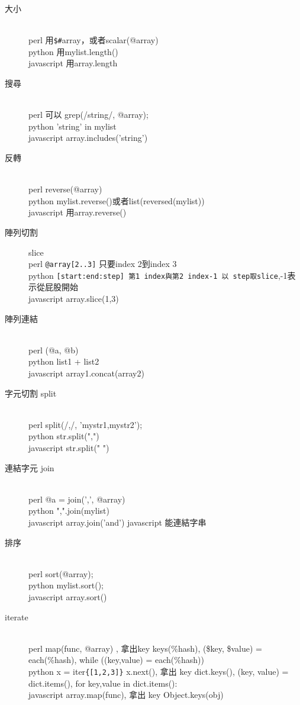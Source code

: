 \begin{description}
  \item [大小] \hfill \\
    perl 用\verb=$#=array，或者scalar(@array)\\
    python 用mylist.length()\\
    javascript 用array.length
  \item [搜尋] \hfill \\
    perl 可以 grep(/string/, @array);\\
    python 'string' in mylist\\
    javascript array.includes('string')
  \item [反轉] \hfill \\
    perl reverse(@array) \\
    python mylist.reverse()或者list(reversed(mylist))\\
    javascript 用array.reverse()
  \item [陣列切割] slice \hfill \\
    perl \verb=@array[2..3]= 只要index 2到index 3\\
    python \verb=[start:end:step] 第1 index與第2 index-1 以 step取slice=,-1表示從屁股開始\\
    javascript array.slice(1,3)
  \item [陣列連結] \hfill \\
    perl (@a, @b) \\
    python list1 + list2\\
    javascript array1.concat(array2)
  \item [字元切割 split] \hfill \\
    perl split(/,/, 'mystr1,mystr2');\\
    python str.split(",")\\
    javascript str.split(" ")
  \item [連結字元 join] \hfill \\
    perl @a = join(',', @array)\\
    python ",".join(mylist)\\
    javascript array.join('and') javascript 能連結字串
  \item [排序] \hfill \\
    perl sort(@array);\\
    python mylist.sort(); \\
    javascript array.sort()
  \item [iterate] \hfill \\
    perl map(func, @array) , 拿出key keys(\%hash), (\$key, \$value) = each(\%hash), while ((key,value) = each(\%hash))\\
    python x = iter\verb={[1,2,3]}= x.next(), 拿出 key dict.keys(), (key, value) = dict.items(), for key,value in dict.items(): \\
    javascript array.map(func), 拿出 key Object.keys(obj)
\end{description}

